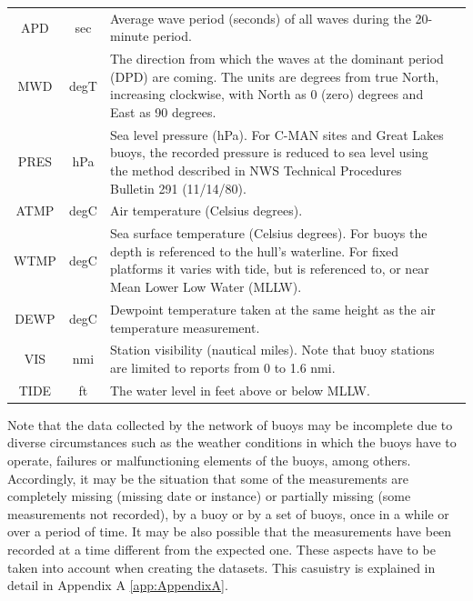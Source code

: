 \documentclass[review]{elsarticle}
\begin{document}
\begin{itemize}
\begin{table}[!ht]
\begin{tabular}{ccm{8.60cm}@{\setlength{\tabcolsep}{0pt}}m{0.0cm}}
					\cellcolor{gray090}APD & \cellcolor{gray090} sec & \cellcolor{gray090} Average wave period (seconds) of all waves during the 20-minute period. \\
					
					MWD & degT & The direction from which the waves at the dominant period (DPD) are coming. The units are degrees from true North, increasing clockwise, with North as 0 (zero) degrees and East as 90 degrees. \\
					
					\cellcolor{gray090}PRES & \cellcolor{gray090} hPa & \cellcolor{gray090} Sea level pressure (hPa). For C-MAN sites and Great Lakes buoys, the recorded pressure is reduced to sea level using the method described in NWS Technical Procedures Bulletin 291 (11/14/80). \\
					
					ATMP & degC & Air temperature (Celsius degrees). &\\[0.10cm]
					
					\cellcolor{gray090}WTMP & \cellcolor{gray090} degC & \cellcolor{gray090} Sea surface temperature (Celsius degrees). For buoys the depth is referenced to the hull's waterline. For fixed platforms it varies with tide, but is referenced to, or near Mean Lower Low Water (MLLW).\\
					
					DEWP & degC & Dewpoint temperature taken at the same height as the air temperature measurement. \\
					
					\cellcolor{gray090}VIS & \cellcolor{gray090} nmi & \cellcolor{gray090} Station visibility (nautical miles). Note that buoy stations are limited to reports from 0 to 1.6 nmi. \\
					
					TIDE & ft & The water level in feet above or below MLLW. \\
					
					\cline{1-4}
						
				\end{tabular}
			 
			\end{table}
			
			Note that the data collected by the network of buoys may be incomplete due to diverse circumstances such as the weather conditions in which the buoys have to operate, failures or malfunctioning elements of the buoys, among others. Accordingly, it may be the situation that some of the measurements are completely missing (missing date or instance) or partially missing (some measurements not recorded), by a buoy or by a set of buoys, once in a while or over a period of time. It may be also possible that the measurements have been recorded at a time different from the expected one. These aspects have to be taken into account when creating the datasets. This casuistry is explained in detail in Appendix A \ref{app:AppendixA}.
			

\end{itemize}
\end{document}
